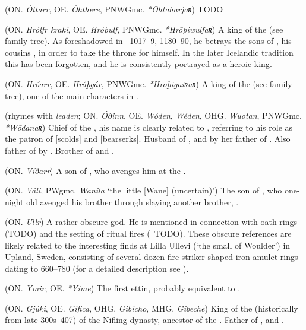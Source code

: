\begin{itemize}
 (ON. \emph{Óttarr}, OE. \emph{Óhthere}, PNWGmc. \emph{*Ōhtaharjaʀ})
  TODO

 (ON. \emph{Hrólfr kraki}, OE. \emph{Hróþulf}, PNWGmc. \emph{*Hrōþiwulfaʀ})
  A king of the  (see family tree). As foreshadowed in \Beowulf\ 1017–9, 1180–90, he betrays the sons of , his cousins , in order to take the throne for himself. In the later Icelandic tradition this has been forgotten, and he is consistently portrayed as a heroic king.

 (ON. \emph{Hróarr}, OE. \emph{Hróþgár}, PNWGmc. \emph{*Hrōþigaiʀaʀ})
  A king of the  (see family tree), one of the main characters in \Beowulf.

 (rhymes with \emph{leaden}; ON. \emph{Óðinn}, OE. \emph{Wóden}, \emph{Wéden}, OHG. \emph{Wuotan}, PNWGmc. \emph{*Wōdanaʀ})
  Chief of the , his name is clearly related to , referring to his role as the patron of [scolds] and [bearserks]. Husband of , and by her father of . Also father of  by . Brother of  and .

 (ON. \emph{Víðarr})
  A son of , who avenges him at the .

 (ON. \emph{Váli}, PWgmc. \emph{Wanila} ‘the little [Wane] (uncertain)’)
  The son of , who one-night old avenged his brother  through slaying another brother, .

 (ON. \emph{Ullr})
  A rather obscure god. He is mentioned in connection with oath-rings (TODO) and the setting of ritual fires (\Grimnismal\ TODO). These obscure references are likely related to the interesting finds at Lilla Ullevi (‘the small  of Woulder’) in Upland, Sweden, consisting of several dozen fire striker-shaped iron amulet rings dating to 660–780 (for a detailed description see \parencite{afEdholm2009}).

 (ON. \emph{Ymir}, OE. \emph{*Yime})
  The first ettin, probably equivalent to .

 (ON. \emph{Gjúki}, OE. \emph{Gifica}, OHG. \emph{Gibicho}, MHG. \emph{Gibeche})
  King of the  (historically from late 300s–407) of the Nifling dynasty, ancestor of the . Father of ,  and .

\end{itemize}


